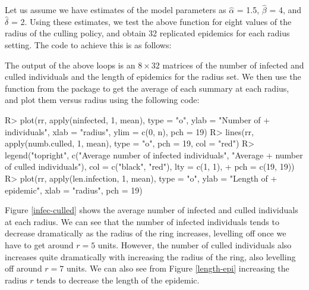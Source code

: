 \documentclass[nojss,shortnames]{jss}
\begin{document}
Let us assume we have estimates of the model parameters as $\hat{\alpha}$ = 1.5, $\hat{\beta}$ = 4, and $\hat{\delta}$ = 2. Using these estimates, we test the above function for eight values of the radius of the culling policy, and obtain 32 replicated epidemics for each radius setting. 
The code to achieve this is as follows:


The output of the above loops is an $8 \times 32$ matrices of the number of infected and culled individuals and the length of epidemics for the radius set. We then use the function  from the  package \citep{CRAN} to get the average of each summary at each radius, and plot them versus radius using the following code: 
\begin{Sinput}
R> plot(rr, apply(ninfected, 1, mean), type = "o", ylab = "Number of 
+    individuals", xlab = "radius", ylim = c(0, n), pch = 19)
R> lines(rr, apply(numb.culled, 1, mean), type = "o", pch = 19, col = "red")
R> legend("topright", c("Average number of infected individuals", "Average 
+    number of culled individuals"), col = c("black", "red"), lty = c(1, 1), 
+    pch = c(19, 19))
R> plot(rr, apply(len.infection, 1, mean), type = "o", ylab = "Length of 
+    epidemic", xlab = "radius", pch = 19)
\end{Sinput}

Figure \ref{infec-culled} shows the average number of infected and culled individuals at each radius. We can see that the number of infected individuals tends to decrease dramatically as the radius of the ring increases, levelling off once we have to get around $r = 5$ units. However, the number of culled individuals also increases quite dramatically with increasing the radius of the ring, also levelling off around $r = 7$ units. We can also see from Figure \ref{length-epi} increasing the radius $r$ tends to decrease the length of the epidemic.
\end{document}
